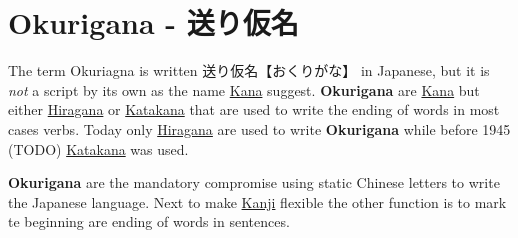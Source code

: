 \section{Okurigana - 送り仮名} \label{sec:Okurigana}

The term Okuriagna is written {送り仮名}{【おくりがな】} in Japanese, but it is
\textit{not} a script by its own as the name \hyperref[sec:Kana]{Kana} suggest.
\textbf{Okurigana} are \hyperref[sec:Kana]{Kana} but either
\hyperref[sec:Hiragana]{Hiragana} or \hyperref[sec:Katakana]{Katakana} that are
used to write the ending of words in most cases verbs. Today only
\hyperref[sec:Hiragagana]{Hiragana} are used to write \textbf{Okurigana} while
before 1945 (TODO) \hyperref[sec:Katakana]{Katakana} was used. 

\textbf{Okurigana} are the mandatory compromise using static Chinese letters to
write the Japanese language. Next to make \hyperref[sec:kanji]{Kanji} flexible
the other function is to mark te beginning are ending of words in sentences. 

